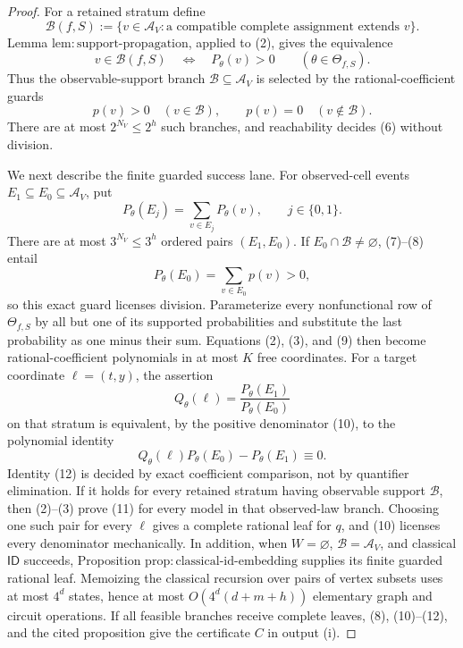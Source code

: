\documentclass{article}
\begin{document}
\begin{proof}
For a retained stratum define
\[
 \mathcal B(f,S)
 :=\{v\in\mathcal A_V:\text{a compatible complete assignment extends }v\}.
 \tag{6}
\]
Lemma \(\mathrm{lem:support\text{-}propagation}\), applied to (2), gives the equivalence
\[
 v\in\mathcal B(f,S)
 \quad\Longleftrightarrow\quad
 P_\theta(v)>0
 \qquad(\theta\in\Theta_{f,S}).
 \tag{7}
\]
Thus the observable-support branch \(\mathcal B\subseteq\mathcal A_V\) is selected by the rational-coefficient guards
\[
 p(v)>0\quad(v\in\mathcal B),
 \qquad
 p(v)=0\quad(v\notin\mathcal B).
 \tag{8}
\]
There are at most \(2^{N_V}\le2^h\) such branches, and reachability decides (6) without division.

We next describe the finite guarded success lane. For observed-cell events \(E_1\subseteq E_0\subseteq\mathcal A_V\), put
\[
 P_\theta(E_j)=\sum_{v\in E_j}P_\theta(v),
 \qquad j\in\{0,1\}.
 \tag{9}
\]
There are at most \(3^{N_V}\le3^h\) ordered pairs \((E_1,E_0)\). If \(E_0\cap\mathcal B\ne\varnothing\), (7)--(8) entail
\[
 P_\theta(E_0)=\sum_{v\in E_0}p(v)>0,
 \tag{10}
\]
so this exact guard licenses division. Parameterize every nonfunctional row of \(\Theta_{f,S}\) by all but one of its supported probabilities and substitute the last probability as one minus their sum. Equations (2), (3), and (9) then become rational-coefficient polynomials in at most \(K\) free coordinates. For a target coordinate \(\ell=(t,y)\), the assertion
\[
 Q_\theta(\ell)
 =\frac{P_\theta(E_1)}{P_\theta(E_0)}
 \tag{11}
\]
on that stratum is equivalent, by the positive denominator (10), to the polynomial identity
\[
 Q_\theta(\ell)P_\theta(E_0)-P_\theta(E_1)\equiv0.
 \tag{12}
\]
Identity (12) is decided by exact coefficient comparison, not by quantifier elimination. If it holds for every retained stratum having observable support \(\mathcal B\), then (2)--(3) prove (11) for every model in that observed-law branch. Choosing one such pair for every \(\ell\) gives a complete rational leaf for \(q\), and (10) licenses every denominator mechanically. In addition, when \(W=\varnothing\), \(\mathcal B=\mathcal A_V\), and classical \(\mathsf{ID}\) succeeds, Proposition \(\mathrm{prop:classical\text{-}id\text{-}embedding}\) supplies its finite guarded rational leaf. Memoizing the classical recursion over pairs of vertex subsets uses at most \(4^d\) states, hence at most \(O(4^d(d+m+h))\) elementary graph and circuit operations. If all feasible branches receive complete leaves, (8), (10)--(12), and the cited proposition give the certificate \(C\) in output (i).


\end{proof}
\end{document}

